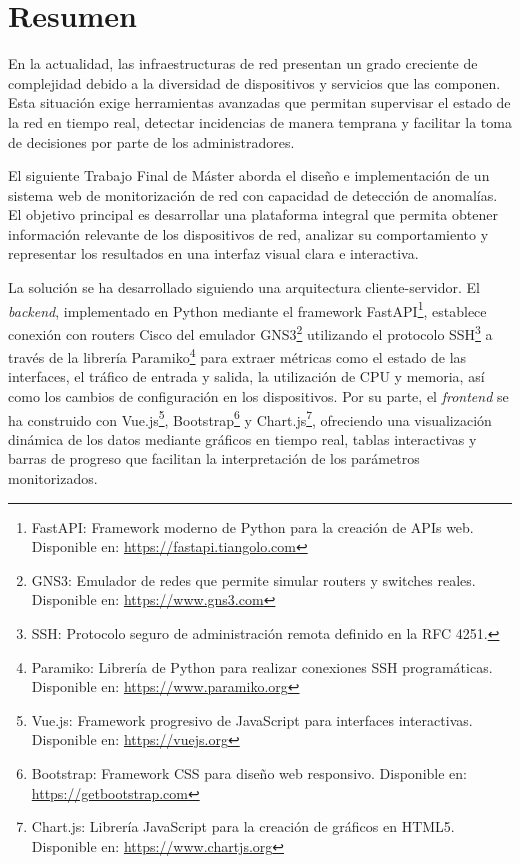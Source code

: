 
\chapter{Resumen}
En la actualidad, las infraestructuras de red presentan un grado creciente de complejidad debido a la diversidad de dispositivos y servicios que las componen. Esta situación exige herramientas avanzadas que permitan supervisar el estado de la red en tiempo real, detectar incidencias de manera temprana y facilitar la toma de decisiones por parte de los administradores.

El siguiente Trabajo Final de Máster aborda el diseño e implementación de un sistema web de monitorización de red con capacidad de detección de anomalías. El objetivo principal es desarrollar una plataforma integral que permita obtener información relevante de los dispositivos de red, analizar su comportamiento y representar los resultados en una interfaz visual clara e interactiva.

La solución se ha desarrollado siguiendo una arquitectura cliente-servidor. El \textit{backend}, implementado en Python mediante el framework FastAPI\footnote{FastAPI: Framework moderno de Python para la creación de APIs web. Disponible en: \url{https://fastapi.tiangolo.com}}, establece conexión con routers Cisco del emulador GNS3\footnote{GNS3: Emulador de redes que permite simular routers y switches reales. Disponible en: \url{https://www.gns3.com}} utilizando el protocolo SSH\footnote{SSH: Protocolo seguro de administración remota definido en la RFC 4251.} a través de la librería Paramiko\footnote{Paramiko: Librería de Python para realizar conexiones SSH programáticas. Disponible en: \url{https://www.paramiko.org}} para extraer métricas como el estado de las interfaces, el tráfico de entrada y salida, la utilización de CPU y memoria, así como los cambios de configuración en los dispositivos. Por su parte, el \textit{frontend} se ha construido con Vue.js\footnote{Vue.js: Framework progresivo de JavaScript para interfaces interactivas. Disponible en: \url{https://vuejs.org}}, Bootstrap\footnote{Bootstrap: Framework CSS para diseño web responsivo. Disponible en: \url{https://getbootstrap.com}} y Chart.js\footnote{Chart.js: Librería JavaScript para la creación de gráficos en HTML5. Disponible en: \url{https://www.chartjs.org}}, ofreciendo una visualización dinámica de los datos mediante gráficos en tiempo real, tablas interactivas y barras de progreso que facilitan la interpretación de los parámetros monitorizados.

